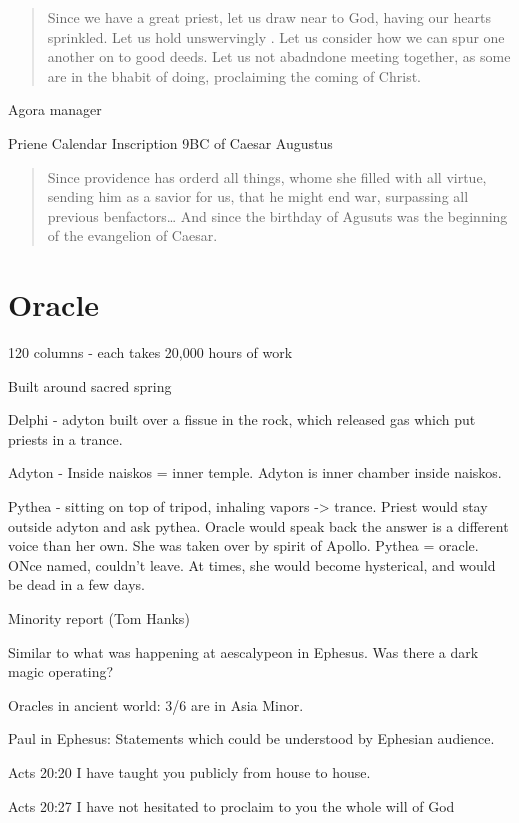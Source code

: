 \documentclass[
]{book}
\begin{document}
\begin{quote}
Since we have a great priest, let us draw near to God, having our hearts sprinkled. Let us hold unswervingly . Let us consider how we can spur one another on to good deeds. Let us not abadndone meeting together, as some are in the bhabit of doing, proclaiming the coming of Christ.
\end{quote}

Agora manager

Priene Calendar Inscription 9BC of Caesar Augustus

\begin{quote}
Since providence has orderd all things, whome she filled with all virtue, sending him as a savior for us, that he might end war, surpassing all previous benfactors\ldots{} And since the birthday of Agusuts was the beginning of the evangelion of Caesar.
\end{quote}

\hypertarget{oracle}{%
\chapter{Oracle}\label{oracle}}

120 columns - each takes 20,000 hours of work

Built around sacred spring

Delphi - adyton built over a fissue in the rock, which released gas which put priests in a trance.

Adyton - Inside naiskos = inner temple. Adyton is inner chamber inside naiskos.

Pythea - sitting on top of tripod, inhaling vapors -\textgreater{} trance. Priest would stay outside adyton and ask pythea. Oracle would speak back the answer is a different voice than her own. She was taken over by spirit of Apollo. Pythea = oracle. ONce named, couldn't leave. At times, she would become hysterical, and would be dead in a few days.

Minority report (Tom Hanks)

Similar to what was happening at aescalypeon in Ephesus. Was there a dark magic operating?

Oracles in ancient world: 3/6 are in Asia Minor.

Paul in Ephesus: Statements which could be understood by Ephesian audience.

Acts 20:20 I have taught you publicly from house to house.

Acts 20:27 I have not hesitated to proclaim to you the whole will of God
\end{document}
